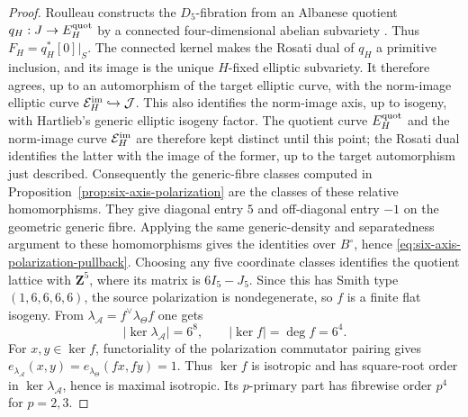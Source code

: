 \begin{proof}
Roulleau constructs the \(D_5\)-fibration from an Albanese quotient
\(q_H:J\to E_H^{\rm quot}\) by a connected four-dimensional abelian
subvariety \cite[the sentence following Lemma~17 and the proof of
Theorem~11(D)]{Roulleau}.  Thus
\(F_H=q_H^*[0]|_S\).  The connected kernel makes the Rosati dual of \(q_H\) a
primitive inclusion, and its image is the unique \(H\)-fixed elliptic
subvariety.  It therefore agrees, up to an automorphism of the target
elliptic curve, with the norm-image elliptic curve
\(\mathcal E_H^{\rm im}\hookrightarrow\mathcal J\).
This also identifies the norm-image axis, up to isogeny, with Hartlieb's
generic elliptic isogeny factor.
The quotient curve \(E_H^{\rm quot}\) and the norm-image curve
\(\mathcal E_H^{\rm im}\) are therefore kept distinct until this point;
the Rosati dual identifies the latter with the image of the former, up to the
target automorphism just described.  Consequently the generic-fibre classes
computed in Proposition~\ref{prop:six-axis-polarization} are the classes of
these relative homomorphisms.  They give diagonal entry \(5\) and
off-diagonal entry \(-1\) on the geometric generic fibre.  Applying the same generic-density and separatedness argument to
these homomorphisms gives the identities over \(B^\circ\), hence
\eqref{eq:six-axis-polarization-pullback}.
Choosing any five coordinate classes identifies the quotient lattice with
\(\mathbf Z^5\), where its matrix is \(6I_5-J_5\).  Since this has Smith type
\((1,6,6,6,6)\), the source polarization is nondegenerate, so \(f\) is a
finite flat isogeny.  From
\(\lambda_{\mathcal A}=f^\vee\lambda_\Theta f\) one gets
\[
 |\ker\lambda_{\mathcal A}|=6^8,
 \qquad |\ker f|=\deg f=6^4.
\]
For \(x,y\in\ker f\), functoriality of the polarization commutator pairing
gives
\(e_{\lambda_{\mathcal A}}(x,y)=e_{\lambda_\Theta}(fx,fy)=1\).
Thus \(\ker f\) is isotropic and has square-root order in
\(\ker\lambda_{\mathcal A}\), hence is maximal isotropic.  Its
\(p\)-primary part has fibrewise order \(p^4\) for \(p=2,3\).


\end{proof}
